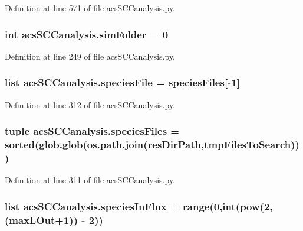 Definition at line 571 of file acs\+S\+C\+Canalysis.\+py.

\hypertarget{a00130_a58095f64afeda893517e81226e1963c3}{
\subsubsection[{sim\+Folder}]{\setlength{\rightskip}{0pt plus 5cm}int acs\+S\+C\+Canalysis.\+sim\+Folder = 0}}\label{a00130_a58095f64afeda893517e81226e1963c3}


Definition at line 249 of file acs\+S\+C\+Canalysis.\+py.

\hypertarget{a00130_a1d066fa24dced2da12ffd9a8514a17ba}{
\subsubsection[{species\+File}]{\setlength{\rightskip}{0pt plus 5cm}list acs\+S\+C\+Canalysis.\+species\+File = {\bf species\+Files}\mbox{[}-\/1\mbox{]}}}\label{a00130_a1d066fa24dced2da12ffd9a8514a17ba}


Definition at line 312 of file acs\+S\+C\+Canalysis.\+py.

\hypertarget{a00130_a4f47408478e9a0590d016df50cf42141}{
\subsubsection[{species\+Files}]{\setlength{\rightskip}{0pt plus 5cm}tuple acs\+S\+C\+Canalysis.\+species\+Files = sorted(glob.\+glob(os.\+path.\+join({\bf res\+Dir\+Path},{\bf tmp\+Files\+To\+Search})))}}\label{a00130_a4f47408478e9a0590d016df50cf42141}


Definition at line 311 of file acs\+S\+C\+Canalysis.\+py.

\hypertarget{a00130_a36f6b63269e716f42cd38a36a781a4cf}{
\subsubsection[{species\+In\+Flux}]{\setlength{\rightskip}{0pt plus 5cm}list acs\+S\+C\+Canalysis.\+species\+In\+Flux = range(0,int(pow(2,({\bf max\+L\+Out}+1)) -\/ 2))}}\label{a00130_a36f6b63269e716f42cd38a36a781a4cf}


